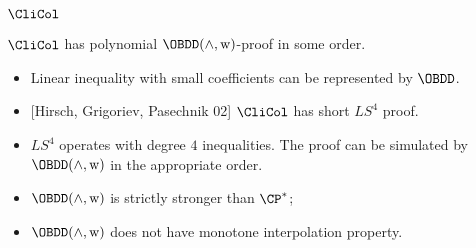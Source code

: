 \begin{frame}{$\CliCol$}

    \begin{theorem}
        $\CliCol$ has polynomial $\OBDD(\land, \weakening)$-proof in some order.
    \end{theorem}

    \pause

    \begin{itemize}
        \item Linear inequality with small coefficients can be represented by $\OBDD$.
        \pause
        \item{} [Hirsch, Grigoriev, Pasechnik 02] $\CliCol$ has short $LS^4$ proof.
        \pause
        \item $LS^4$ operates with degree $4$ inequalities. The proof can be simulated by $\OBDD(\land,
            \weakening)$ in the appropriate order.
    \end{itemize}

    \pause
    \begin{corollary}
        \begin{itemize}
            \item $\OBDD(\land, \weakening)$ is strictly stronger than $\CP^*$;
            \item $\OBDD(\land, \weakening)$ does not have monotone interpolation property.
        \end{itemize}
    \end{corollary}

\end{frame}


